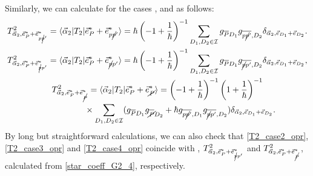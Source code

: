 \documentclass[pdftex]{sigma}
\numberwithin{equation}{section}
\begin{document}
Similarly, we can calculate for the cases
,
and
as follows:
\begin{gather}
T^{2}_{\vec{\alpha}_{2},
\vec{e}_{P}^{\ast}
+
\vec{e}_{p\cancel{p}'}^{\ast}
}
=
\langle
\vec{\alpha}_{2}
|
T_{2}
|
\vec{e}_{P}^{\ast}
+
\vec{e}_{p\cancel{p}'}^{\ast}
\rangle
=
\hbar
 \left(
-1
+
\frac{1}{\hbar}
 \right)^{-1}
\sum_{
D_{1},D_{2}
\in
\mathcal{I}
}
g_{\overline{P}D_{1}}
g_{\overline{p\cancel{p}'},D_{2}}
\delta_{
\vec{\alpha}_{2},
\vec{e}_{D_{1}}
+
\vec{e}_{D_{2}}
}.
\label{T2_case2_opr}
\\
T^{2}_{\vec{\alpha}_{2},
\vec{e}_{P}^{\ast}
+
\vec{e}_{\cancel{p}p'}^{\ast}
}
=
\langle
\vec{\alpha}_{2}
|
T_{2}
|
\vec{e}_{P}^{\ast}
+
\vec{e}_{\cancel{p}p'}^{\ast}
\rangle
=
\hbar
 \left(
-1
+
\frac{1}{\hbar}
 \right)^{-1}
\sum_{
D_{1},D_{2}
\in
\mathcal{I}
}
g_{\overline{P}D_{1}}
g_{\overline{\cancel{p}p'},D_{2}}
\delta_{
\vec{\alpha}_{2},
\vec{e}_{D_{1}}
+
\vec{e}_{D_{2}}
},
\label{T2_case3_opr}
\\
T^{2}_{\vec{\alpha}_{2},
\vec{e}_{P}^{\ast}
+
\vec{e}_{\cancel{P}}^{\ast}
}
=
\langle
\vec{\alpha}_{2}
|
T_{2}
|
\vec{e}_{P}^{\ast}
+
\vec{e}_{\cancel{P}}^{\ast}
\rangle=
 \left(
-1
+
\frac{1}{\hbar}
 \right)^{-1}
 \left(
1
+
\frac{1}{\hbar}
 \right)^{-1}
\nonumber
\\
\phantom{T^{2}_{\vec{\alpha}_{2},
\vec{e}_{P}^{\ast}
+
\vec{e}_{\cancel{P}}^{\ast}
}
=}{}
\times
\sum_{
D_{1},D_{2}
\in
\mathcal{I}
}
 (
g_{\overline{P}D_{1}}
g_{\overline{\cancel{P}}D_{2}}
+
\hbar
g_{\overline{p\cancel{p}'},D_{1}}
g_{\overline{\cancel{p}p'},D_{2}}
 )
\delta_{
\vec{\alpha}_{2},
\vec{e}_{D_{1}}
+
\vec{e}_{D_{2}}
}
.
\label{T2_case4_opr}
\end{gather}
By long but straightforward calculations, we can also check that \eqref{T2_case2_opr}, \eqref{T2_case3_opr} and \eqref{T2_case4_opr} coincide with
,
$
T^{2}_{\vec{\alpha}_{2},
\vec{e}_{P}^{\ast}
+
\vec{e}_{\cancel{p}p'}^{\ast}
}
$
and
$
T^{2}_{\vec{\alpha}_{2},
\vec{e}_{P}^{\ast}
+
\vec{e}_{\cancel{P}}^{\ast}
}
$,
calculated from \eqref{star_coeff_G2_4}, respectively.
\end{document}
